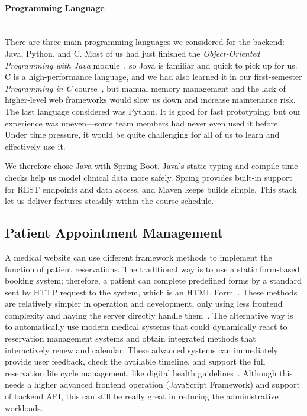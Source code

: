 \paragraph{Programming Language}\mbox{}\\
There are three main programming languages we considered for the backend: Java, Python, and C. Most of us had just finished the \textit{Object-Oriented Programming with Java} module~\cite{uob-oop-java-2024}, so Java is familiar and quick to pick up for us. C is a high-performance language, and we had also learned it in our first-semester \textit{Programming in C} course~\cite{uob-prog-in-c-2024}, but manual memory management and the lack of higher-level web frameworks would slow us down and increase maintenance risk. The last language considered was Python. It is good for fast prototyping, but our experience was uneven—some team members had never even used it before. Under time pressure, it would be quite challenging for all of us to learn and effectively use it.

We therefore chose Java with Spring Boot. Java's static typing and compile-time checks help us model clinical data more safely. Spring provides built-in support for REST endpoints and data access, and Maven keeps builds simple. This stack let us deliver features steadily within the course schedule.

\subsection{Patient Appointment Management}
\label{subsec:patient-appointment-management}

A medical website can use different framework methods to implement the function of patient reservations. The traditional way is to use a static form-based booking system; therefore, a patient can complete predefined forms by a standard sent by HTTP request to the system, which is an HTML Form~\cite{mdn-html-forms}. These methods are relatively simpler in operation and development, only using less frontend complexity and having the server directly handle them~\cite{spring-boot-web}. The alternative way is to automatically use modern medical systems that could dynamically react to reservation management systems and obtain integrated methods that interactively renew and calendar. These advanced systems can immediately provide user feedback, check the available timeline, and support the full reservation life cycle management, like digital health guidelines~\cite{who-digital-health}. Although this needs a higher advanced frontend operation (JavaScript Framework) and support of backend API, this can still be really great in reducing the administrative workloads.
